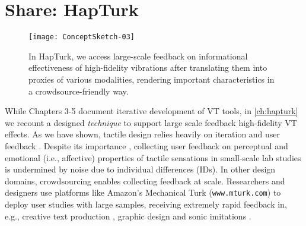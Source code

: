 
\chapter{Share: HapTurk}
\label{ch:hapturk}


\begin{figure}[h] %
   \centering
   \texttt{[image: ConceptSketch-03]} 
   \caption{In HapTurk, we access large-scale feedback on informational effectiveness of high-fidelity vibrations after translating them into proxies of various modalities, rendering important characteristics in a crowdsource-friendly way.}
   \label{fig:hapturk:conceptsketch}
\end{figure}


While Chapters 3-5 document iterative development of VT tools, in \autoref{ch:hapturk} we recount a designed \emph{technique} to support large scale feedback high-fidelity VT effects.
As we have shown,
tactile design  relies heavily on iteration and user feedback \cite{Schneider2014}.
Despite its importance \cite{Seifi2014,Seifi2015}, collecting user feedback on perceptual and emotional (i.e., affective) properties  of tactile sensations in small-scale lab studies is undermined by noise due to individual differences (IDs). %
    In other design domains, crowdsourcing  enables collecting feedback at scale.
    Researchers and designers use platforms like Amazon's Mechanical Turk %
    (\texttt{www.mturk.com}) to deploy user studies with large samples, receiving extremely rapid feedback in, e.g., creative text production \cite{Siangliulue2015}, graphic design \cite{Xu2014} and sonic imitations \cite{Cartwright2015}.
    

